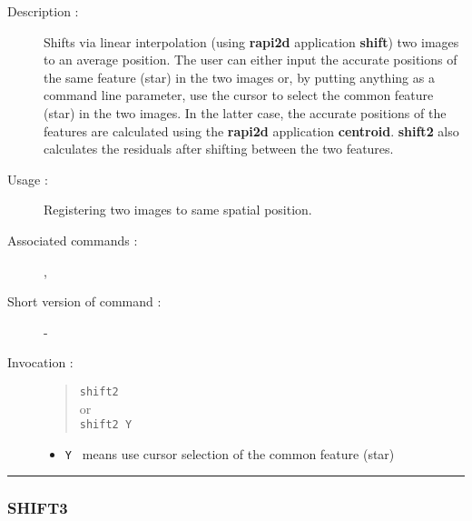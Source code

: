 \begin{description}

\item[Description :] Shifts via linear interpolation (using {\bf
rapi2d} application {\bf shift}) two images to an average position.
The user can either input the accurate positions of the same feature
(star) in the two images or, by putting anything as a command line
parameter, use the cursor to select the common feature (star) in the
two images. In the latter case, the accurate positions of the features
are calculated using the {\bf rapi2d} application {\bf centroid}.  {\bf
shift2} also calculates the residuals after shifting between the two
features.

\item[Usage :] Registering two images to same spatial position.

\item[Associated commands :] {\tt {}}, 
{\tt {}}
\item[Short version of command :] -
\item[Invocation :]

\begin{quote}{\tt  shift2 }\\
or \\
{\tt shift2 Y }
\end{quote}

\begin{itemize}

\item {\tt Y } means use cursor selection of the common feature (star)
\end{itemize}

\end{description}

\hrule 
\subsubsection*{\label{SHIFT3}SHIFT3}

